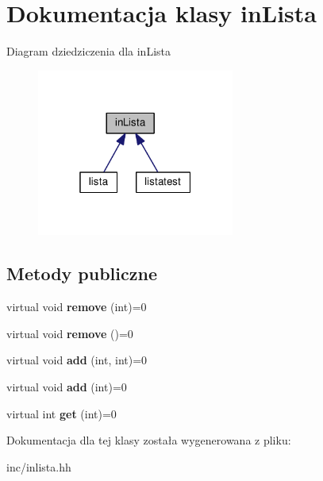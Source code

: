 \section{Dokumentacja klasy in\+Lista}
\label{classin_lista}


Diagram dziedziczenia dla in\+Lista
\nopagebreak
\begin{figure}[H]
\begin{center}
\leavevmode
\includegraphics[width=184pt]{classin_lista__inherit__graph}
\end{center}
\end{figure}
\subsection*{Metody publiczne}
\begin{DoxyCompactItemize}
\item 
virtual void {\bfseries remove} (int)=0\label{classin_lista_abfa8aec6ac57b58ab0d890038d722e2e}

\item 
virtual void {\bfseries remove} ()=0\label{classin_lista_a6c153759e6ddb28590bdd13aa3e6e995}

\item 
virtual void {\bfseries add} (int, int)=0\label{classin_lista_a5086e60e89b9eb884219190c38daa9bd}

\item 
virtual void {\bfseries add} (int)=0\label{classin_lista_a6308248620986ae04e828f8a1ecde258}

\item 
virtual int {\bfseries get} (int)=0\label{classin_lista_a55ba3ad03b786ee930ba83c9b1c89fa4}

\end{DoxyCompactItemize}


Dokumentacja dla tej klasy została wygenerowana z pliku\+:\begin{DoxyCompactItemize}
\item 
inc/inlista.\+hh\end{DoxyCompactItemize}
